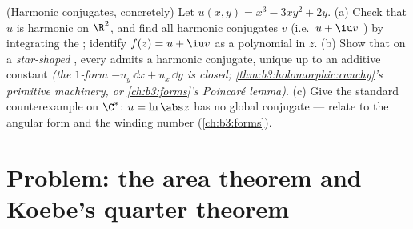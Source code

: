 \begin{exercise}[$\star\star$]\label{exo:b3:conformal:12}
(Harmonic conjugates, concretely) Let $u(x, y) = x^3 - 3xy^2
+ 2y$.
(a) Check that $u$ is harmonic on $\R^2$, and find all
harmonic conjugates $v$ (i.e.\ $u + \iu v$ ) by
integrating the ; identify $f(z) =
u + \iu v$ as a polynomial in $z$.
(b) Show that on a \emph{star-shaped} , every
 admits a harmonic conjugate, unique up to
an additive constant \emph{(the $1$-form $-u_y\,\dd x +
u_x\,\dd y$ is closed; \cref{thm:b3:holomorphic:cauchy}'s
primitive machinery, or \cref{ch:b3:forms}'s Poincar\'e
lemma)}.
(c) Give the standard counterexample on
$\C^*$: $u = \ln\abs z$ has no global conjugate --- relate
to the angular form and the winding number
(\cref{ch:b3:forms}).
\end{exercise}

\section{Problem: the area theorem and Koebe's quarter
theorem}

